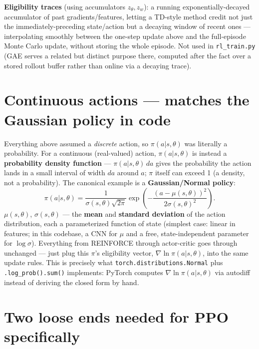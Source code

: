 \documentclass[11pt]{article}
\begin{document}
\textbf{Eligibility traces} (using accumulators $z_\theta, z_w$): a running
exponentially-decayed accumulator of past gradients/features, letting a TD-style method
credit not just the immediately-preceding state/action but a decaying window of recent
ones --- interpolating smoothly between the one-step update above and the full-episode
Monte Carlo update, without storing the whole episode. Not used in \texttt{rl\_train.py}
(GAE serves a related but distinct purpose there, computed after the fact over a stored
rollout buffer rather than online via a decaying trace).

\section*{Continuous actions --- matches the Gaussian policy in code}

Everything above assumed a \emph{discrete} action, so $\pi(a|s,\theta)$ was literally a
probability. For a continuous (real-valued) action, $\pi(a|s,\theta)$ is instead a
\textbf{probability density function} --- $\pi(a|s,\theta)\,da$ gives the probability the
action lands in a small interval of width $da$ around $a$; $\pi$ itself can exceed 1 (a
density, not a probability). The canonical example is a \textbf{Gaussian/Normal policy}:
$$\pi(a|s,\theta) = \frac{1}{\sigma(s,\theta)\sqrt{2\pi}}\exp\left(-\frac{(a-\mu(s,\theta))^2}{2\sigma(s,\theta)^2}\right).$$
$\mu(s,\theta)$, $\sigma(s,\theta)$ --- the \textbf{mean} and \textbf{standard deviation} of
the action distribution, each a parameterized function of state (simplest case: linear in
features; in this codebase, a CNN for $\mu$ and a free, state-independent parameter for
$\log\sigma$). Everything from REINFORCE through actor-critic goes through unchanged ---
just plug this $\pi$'s eligibility vector, $\nabla\ln\pi(a|s,\theta)$, into the same update
rules. This is precisely what \texttt{torch.distributions.Normal} plus
\texttt{.log\_prob().sum()} implements: PyTorch computes $\nabla\ln\pi(a|s,\theta)$ via
autodiff instead of deriving the closed form by hand.

\section*{Two loose ends needed for PPO specifically}
\end{document}
